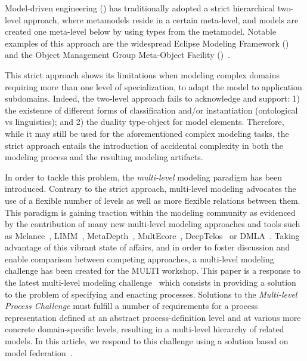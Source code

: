 Model-driven engineering (\MDE) has traditionally adopted a strict hierarchical
two-level approach, where metamodels reside in a certain meta-level, and models
are created one meta-level below by using types from the metamodel. Notable
examples of this approach are the widespread Eclipse Modeling Framework
(\EMF)~\parencite{emf} and the Object Management Group Meta-Object Facility
(\MOF)~\parencite{omg2013mof}.

This strict approach shows its limitations when modeling complex domains
requiring more than one level of specialization, \eg to adapt the model to
application subdomains. Indeed, the two-level approach fails to acknowledge and
support: 1) the existence of different forms of classification and/or
instantiation (\eg ontological vs linguistics); and 2) the duality type-object
for model elements. Therefore, while it may still be used for the
aforementioned complex modeling tasks, the strict approach entails the
introduction of accidental complexity in both the modeling process and the
resulting modeling artifacts.

In order to tackle this problem, the \emph{multi-level} modeling paradigm has
been introduced. Contrary to the strict approach, multi-level modeling
advocates the use of a flexible number of levels as well as more flexible
relations between them. %
This paradigm is gaining traction within the modeling community as evidenced by
the contribution of many new multi-level modeling approaches and tools such as
Melanee~\parencite{melanee}, LIMM~\parencite{icse2011-limm},
MetaDepth~\parencite{metadepth}, MultEcore~\parencite{multecore2016},
DeepTelos~\parencite{deeptelos2016} or DMLA~\parencite{dmla2017}. Taking
advantage of this vibrant state of affairs, and in order to foster discussion
and enable comparison between competing approaches, a multi-level modeling
challenge has been created for the MULTI workshop. This paper is a response to
the latest multi-level modeling challenge~\parencite{multiProcessChallenge-emisaj}
which consists in providing a solution to the problem of specifying and
enacting processes. Solutions to the \emph{Multi-level Process Challenge} must
fulfill a number of requirements for a process representation defined at an
abstract process-definition level and at various more concrete domain-specific
levels, resulting in a multi-level hierarchy of related models. In this
article, we respond to this challenge using a solution based on model
federation~\parencite{Golra2016-federation}.

